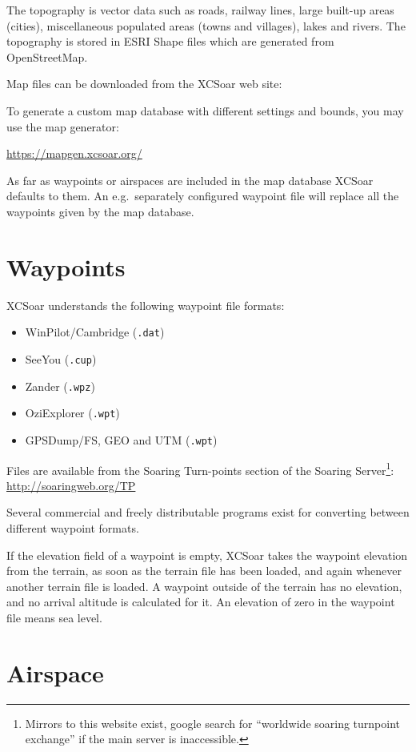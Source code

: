 The topography is vector data such as roads, railway lines, large
built-up areas (cities), miscellaneous populated areas (towns and
villages), lakes and rivers.  The topography is stored in ESRI Shape
files which are generated from OpenStreetMap.

Map files can be downloaded from the XCSoar web site:


To generate a custom map database with different settings and bounds, you
may use the map generator:

\url{https://mapgen.xcsoar.org/}

As far as waypoints or airspaces are included in the map database XCSoar
defaults to them. An e.g.\ separately configured waypoint file will replace all the
waypoints given by the map database.

\section{Waypoints}

XCSoar understands the following waypoint file formats:

\begin{itemize}
\item WinPilot/Cambridge (\verb|.dat|)
\item SeeYou (\verb|.cup|)
\item Zander (\verb|.wpz|)
\item OziExplorer (\verb|.wpt|)
\item GPSDump/FS, GEO and UTM (\verb|.wpt|)
\end{itemize}

Files are available from the Soaring Turn-points section of the
Soaring Server\footnote{Mirrors to this website exist, google search
for ``worldwide soaring turnpoint exchange'' if the main server is
inaccessible.}: \url{http://soaringweb.org/TP}

Several commercial and freely distributable programs exist for
converting between different waypoint formats.

If the elevation field of a waypoint is empty, XCSoar takes the
waypoint elevation from the terrain, as soon as the terrain file has
been loaded, and again whenever another terrain file is loaded.  A
waypoint outside of the terrain has no elevation, and no arrival
altitude is calculated for it.  An elevation of zero in the waypoint
file means sea level.

\section{Airspace}

